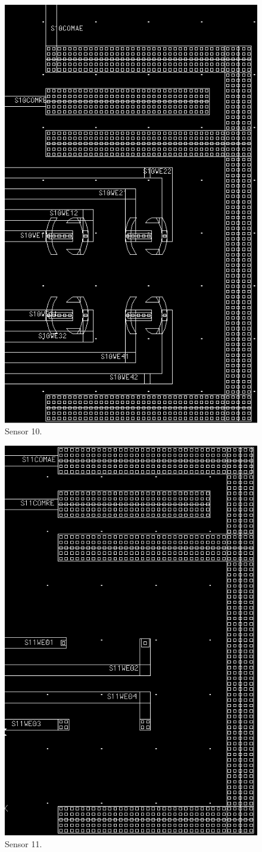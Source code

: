 \begin{figure}
	\centering
	\includegraphics[width=0.7\linewidth]{figures/s10.png}
	\caption{Sensor 10.}
	\label{s10}
\end{figure}

\begin{figure}
	\centering
	\includegraphics[width=0.7\linewidth]{figures/s11.png}
	\caption{Sensor 11.}
	\label{s11}
\end{figure}

